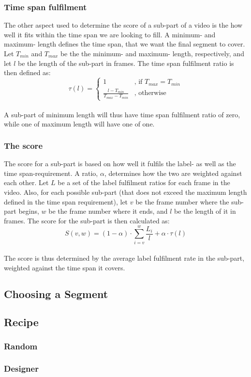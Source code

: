 \subsubsection{Time span fulfilment}
%
The other aspect used to determine the score of a sub-part of a video is the how well it fits within the time span we are looking to fill. A minimum- and maximum- length defines the time span, that we want the final segment to cover. Let $T_{min}$ and $T_{max}$ be the the minimum- and maximum- length, respectively, and let $l$ be the length of the sub-part in frames. The time span fulfilment ratio is then defined as:\\
%
\begin{equation}
\tau(l) =
\begin{cases}
1 & \text{, if } T_{max} = T_{min}\\
\frac{l-T_{min}}{T_{max}-T_{min}} &  \text{, otherwise}
\end{cases}
\end{equation} 
%
\\
%
A sub-part of minimum length will thus have time span fulfilment ratio of zero, while one of maximum length will have one of one. 
%
\subsubsection{The score}
%
The score for a sub-part is based on how well it fulfils the label- as well as the time span-requirement. A ratio, $\alpha$, determines how the two are weighted against each other. Let $L$ be a set of the label fulfilment ratios for each frame in the video. Also, for each possible sub-part (that does not exceed the maximum length defined in the time span requirement), let $v$ be the frame number where the sub-part begins, $w$ be the frame number where it ends, and $l$ be the length of it in frames. The score for the sub-part is then calculated as:\\
%
\begin{equation}
S(v,w) =(1-\alpha) \cdot \sum_{i=v}^{w} \frac{L_{i}}{l} + \alpha \cdot \tau(l)
\end{equation}
%
\\
%
The score is thus determined by the average label fulfilment rate in the sub-part, weighted against the time span it covers.
%
\subsection{Choosing a Segment}
%

%
\subsection{Recipe}
%

%
\subsubsection{Random}
%

%
\subsubsection{Designer}
%
